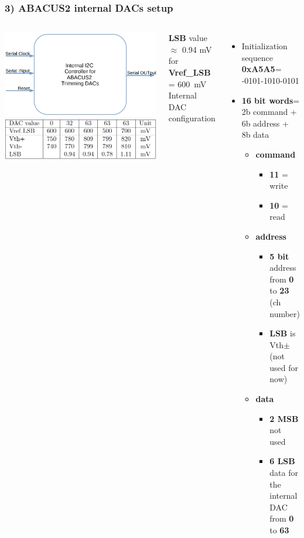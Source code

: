 \documentclass[aspectratio=169]{beamer}
\begin{document}
	\begin{frame}
		\frametitle{3) ABACUS2 internal DACs setup}	
		\begin{columns}
			\begin{center}
				\includegraphics[width=0.7 \textwidth]{IMG2/INTERNALDAC}
				\includegraphics[width=0.7 \textwidth]{IMG/TableLSB.PNG}
			\end{center}
			\textbf{LSB} value $\approx$ 0.94 mV for \textbf{Vref\_LSB} = 600~mV
			{\color{blue} Internal DAC configuration}
			\begin{itemize}
				\item Initialization sequence \textbf{0xA5A5}= 
				-0101-1010-0101
				\item \textbf{16 bit words}= \newline 2b command + 6b address + 8b data
				\begin{itemize}
					\item \textbf{command}
					\begin{itemize}
						\item \textbf{11} = write
						\item \textbf{10} = read
					\end{itemize}
					\item \textbf{address}
					\begin{itemize}
						\item \textbf{5 bit} address from \textbf{0} to \textbf{23} (ch number)
						\item \textbf{LSB} is Vth$\pm$ (not used for now)
					\end{itemize}
					\item \textbf{data}
					\begin{itemize}
						\item \textbf{2 MSB} not used
						\item \textbf{6 LSB} data for the internal DAC \newline from \textbf{0} to \textbf{63}
					\end{itemize}
				\end{itemize} 
			\end{itemize}
		\end{columns}
	\end{frame}
\end{document}
